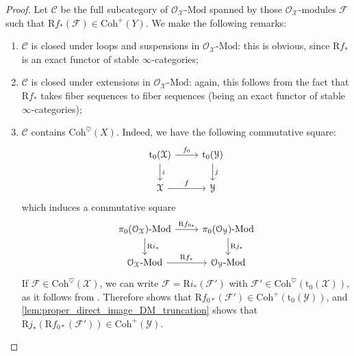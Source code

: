 \documentclass[12pt,a4paper,reqno]{amsart}
\theoremstyle{plain}
\theoremstyle{definition}
\theoremstyle{remark}
\numberwithin{equation}{section}
\begin{document}
\begin{proof}
	Let ${\mathcal C}$ be the full subcategory of ${\mathcal O}_{\mathcal X} \textrm{-} {\mathrm{Mod}}$ spanned by those ${\mathcal O}_{\mathcal X}$-modules ${\mathcal F}$ such that ${\mathrm R} f_*({\mathcal F}) \in {\mathrm{Coh}}^+(Y)$.
	We make the following remarks:
	\begin{enumerate}
		\item ${\mathcal C}$ is closed under loops and suspensions in ${\mathcal O}_{\mathcal X} \textrm{-} {\mathrm{Mod}}$: this is obvious, since ${\mathrm R} f_*$ is an exact functor of stable $\infty$-categories;
		\item ${\mathcal C}$ is closed under extensions in ${\mathcal O}_{\mathcal X} \textrm{-} {\mathrm{Mod}}$: again, this follows from the fact that ${\mathrm R} f_*$ takes fiber sequences to fiber sequences (being an exact functor of stable $\infty$-categories);
		\item ${\mathcal C}$ contains ${\mathrm{Coh}}^\heartsuit(X)$. Indeed, we have the following commutative square:
		\[ \begin{tikzcd}
		{\mathrm{t}_0}({\mathcal X}) \arrow{r}{f_0} \arrow{d}{i} & {\mathrm{t}_0}({\mathcal Y}) \arrow{d}{j} \\
		{\mathcal X} \arrow{r}{f} & {\mathcal Y}
		\end{tikzcd} \]
		which induces a commutative square
		\[ \begin{tikzcd}
		\pi_0({\mathcal O}_{\mathcal X}) \textrm{-} {\mathrm{Mod}} \arrow{r}{{\mathrm R} f_{0*}} \arrow{d}{{\mathrm R} i_*} & \pi_0({\mathcal O}_{\mathcal Y}) \textrm{-} {\mathrm{Mod}} \arrow{d}{{\mathrm R} j_*} \\
		{\mathcal O}_{\mathcal X} \textrm{-} {\mathrm{Mod}} \arrow{r}{{\mathrm R} f_*} & {\mathcal O}_{\mathcal Y} \textrm{-} {\mathrm{Mod}}
		\end{tikzcd} \]
		If ${\mathcal F} \in {\mathrm{Coh}}^\heartsuit({\mathcal X})$, we can write ${\mathcal F} = {\mathrm R} i_*({\mathcal F}')$ with ${\mathcal F}' \in {\mathrm{Coh}}^\heartsuit({\mathrm{t}_0}({\mathcal X}))$, as it follows from \cite[Remark 2.1.5]{DAG-VIII}.
		Therefore \cite[Theorem 5.11]{Porta_Yu_Higher_analytic_stacks_2014} shows that ${\mathrm R} f_{0*}({\mathcal F}') \in {\mathrm{Coh}}^+({\mathrm{t}_0}({\mathcal Y}))$, and \cref{lem:proper_direct_image_DM_truncation} shows that ${\mathrm R} j_*({\mathrm R} f_{0*}({\mathcal F}')) \in {\mathrm{Coh}}^+({\mathcal Y})$.
	\end{enumerate}
	

\end{proof}
\end{document}
